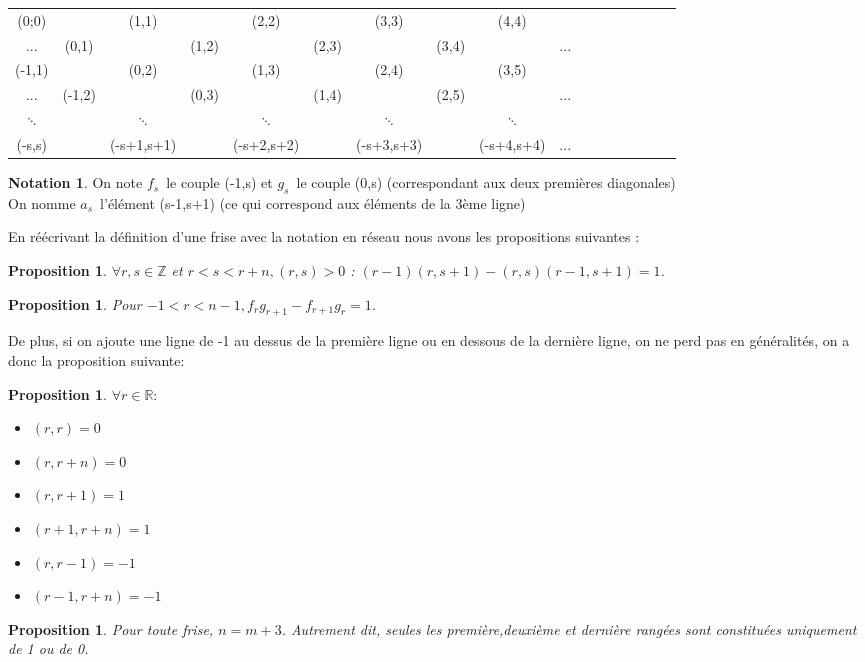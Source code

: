 \documentclass[a4paper]{article}
\theoremstyle{plain}
\newtheorem{prop}[thm]{Proposition}
\theoremstyle{definition}
\newtheorem{nota}{Notation}[section]
\theoremstyle{proof}
\theoremstyle{remark}
\begin{document}
\begin{center}
\begin{tabular}{ccccccccccccccccc}
(0;0)&&(1,1)&&(2,2)&&(3,3)&&(4,4)\\
...&(0,1)&&(1,2)&&(2,3)&&(3,4)&&...\\
(-1,1)&&(0,2)&&(1,3)&&(2,4)&&(3,5)\\
...&(-1,2)&&(0,3)&&(1,4)&&(2,5)&&...\\
$\ddots$&&$\ddots$&&$\ddots$&&$\ddots$&&$\ddots$\\
(-s,s)&&(-s+1,s+1)&&(-s+2,s+2)&&(-s+3,s+3)&&(-s+4,s+4)&...\\
\end{tabular}
\end{center}
\begin{nota}
On note \textbf{$f_s$}\ le couple (-1,s) et \textbf{$g_s$}\ le couple (0,s) (correspondant aux deux premières diagonales)
\\
On nomme \textbf{$a_s$}\ l'élément (s-1,s+1) (ce qui correspond aux éléments de la 3ème ligne)
\end{nota}

En réécrivant la définition d'une frise avec la notation en réseau nous avons les propositions suivantes :
\begin{prop}
$\forall r,s \in \mathbb{Z}$ et $r<s<r+n, (r,s)>0$ : $(r-1)(r,s+1)-(r,s)(r-1,s+1)=1$.
\end{prop}

\begin{prop}
Pour $ -1<r<n-1, f_rg_{r+1}-f_{r+1}g_{r}=1$.
\end{prop}

De plus, si on ajoute une ligne de -1 au dessus de la première ligne ou en dessous de la dernière ligne, on ne perd pas en généralités, on a donc la proposition suivante:
\begin{prop}
$\forall r \in \mathbb{R} : $
\begin{itemize}
\item $(r,r)=0$
\item $(r,r+n)=0$
\item $(r,r+1)=1$
\item $(r+1,r+n)=1$
\item $(r,r-1)=-1$
\item $(r-1,r+n)=-1$
\end{itemize}
\end{prop}

\begin{prop}
Pour toute frise, $n=m+3$.
Autrement dit, seules les première,deuxième et dernière rangées sont constituées uniquement de 1 ou de 0. 
\end{prop}
\end{document}
